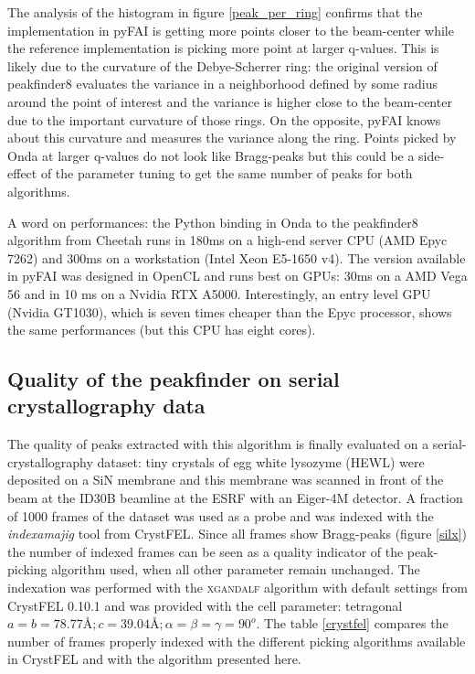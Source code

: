 \documentclass[preprint]{iucr}              %
\begin{document}
The analysis of the histogram in figure \ref{peak_per_ring} confirms that the implementation in pyFAI is getting more points closer to the beam-center while the reference implementation is picking more point at larger q-values.
This is likely due to the curvature of the Debye-Scherrer ring: the original version of peakfinder8 evaluates the variance in a neighborhood defined by some radius around the point of interest and the variance is higher close to the beam-center due to the important curvature of those rings.
On the opposite, pyFAI knows about this curvature and measures the variance along the ring.
Points picked by Onda at larger q-values do not look like Bragg-peaks but this could be a side-effect of the parameter tuning to get the same number of peaks for both algorithms.

A word on performances: the Python binding in Onda to the peakfinder8 algorithm from Cheetah runs in 180ms on a high-end server CPU (AMD Epyc 7262) and 300ms on a workstation (Intel Xeon E5-1650 v4). 
The version available in pyFAI was designed in OpenCL \cite{opencl_khronos, opencl, pyopencl} and runs best on GPUs: 30ms on a AMD Vega 56 and in 10 ms on a Nvidia RTX A5000. 
Interestingly, an entry level GPU (Nvidia GT1030), which is seven times cheaper than the Epyc processor, shows the same performances (but this CPU has eight cores). %

\subsection{Quality of the peakfinder on serial crystallography data}
\label{quality-pf}
The quality of peaks extracted with this algorithm is finally evaluated on a serial-crystallography dataset: tiny crystals of egg white lysozyme (HEWL) were deposited on a SiN membrane and this membrane was scanned in front of the beam at the ID30B beamline at the ESRF with an Eiger-4M detector.%
A fraction of 1000 frames of the dataset \cite{ssx-Lyso} was used as a probe and was indexed with the \textit{indexamajig} tool from CrystFEL. 
Since all frames show Bragg-peaks (figure \ref{silx}) the number of indexed frames can be seen as a quality indicator of the peak-picking algorithm used, when all other parameter remain unchanged.
The indexation was performed with the \textsc{xgandalf} algorithm \cite{xgandalf} with default settings from CrystFEL 0.10.1 and was provided with the cell parameter: tetragonal $a=b=78.77\text{\AA}; c=39.04\text{\AA}; \alpha=\beta=\gamma = 90^o$.
The table \ref{crystfel} compares the number of frames properly indexed with the different picking algorithms available in CrystFEL and with the algorithm presented here. 
\end{document}
